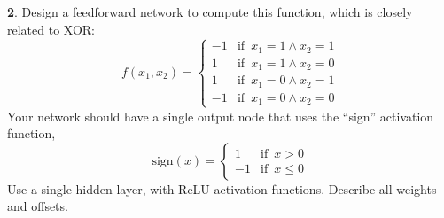 \textbf{2}. Design a feedforward network to compute this function, which is closely related to XOR:
\begin{equation*}
    f(x_1, x_2) = \left\{
	\begin{array}{ll}
	    -1 &\text{if } \, x_1 = 1 \land x_2 = 1 \\
	    1 &\text{if } \, x_1 = 1 \land x_2 = 0 \\	
	    1 &\text{if } \, x_1 = 0 \land x_2 = 1 \\
	    -1 &\text{if } \, x_1 = 0 \land x_2 = 0
	\end{array}
    \right.
\end{equation*}
Your network should have a single output node that uses the “sign” activation function,
\begin{equation*}
   \text{sign}(x) = \left\{
	\begin{array}{ll}
	    1 &\text{if } \, x > 0 \\
	    -1 &\text{if } \, x \leq 0
	\end{array}
    \right. 
\end{equation*}
Use a single hidden layer, with ReLU activation functions. Describe all weights and offsets.

    
